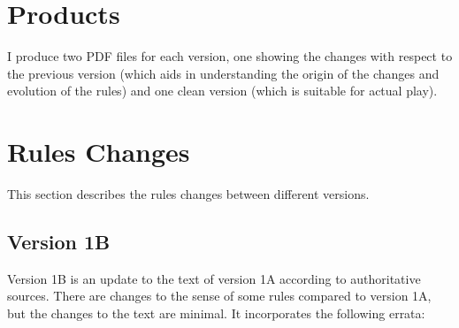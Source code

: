 \documentclass[10pt]{report}
\begin{document}
\section{Products}

I produce two PDF files for each version, one showing the changes with respect to the previous version (which aids in understanding the origin of the changes and evolution of the rules) and one clean version (which is suitable for actual play).



\section{Rules Changes}

This section describes the rules changes between different versions.

\subsection{Version 1B}

Version 1B is an update to the text of version 1A according to authoritative sources. There are changes to the sense of some rules compared to version 1A, but the changes to the text are minimal. It incorporates the following errata:
\end{document}
